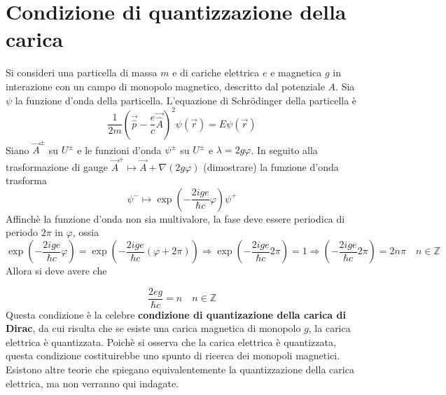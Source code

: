 \section{Condizione di quantizzazione della carica}
Si consideri una particella di massa $m$ e di cariche elettrica $e$ e magnetica
$g$ in interazione con un campo di monopolo magnetico, descritto dal potenziale
$A$. Sia $\psi$ la funzione d'onda della particella. L'equazione di Schrödinger
della particella è
\begin{equation}
   \frac{1}{2m}\left( \vec{\hat{p}} - \frac{e}{c} \vec{\hat{A}} \right)^2 \psi(\vec r) = E\psi(\vec r)
\end{equation}
Siano $\vec A^\pm$ su $U^\pm$ e le funzioni d'onda $\psi^\pm$ su $U^\pm$ e $\lambda =2g\varphi$.
In seguito alla trasformazione di gauge $ \vec A^+ \mapsto \vec A + \nabla (2g\varphi)$ (dimostrare)
la funzione d'onda trasforma
$$ \psi^- \mapsto \exp \left( - \frac{2ige}{\hbar c} \varphi \right) \psi^+$$
Affinchè la funzione d'onda non sia multivalore, la fase deve essere periodica di
periodo $2\pi$ in $\varphi$, ossia
$$
   \exp \left( - \frac{2ige}{\hbar c} \varphi \right)
      = \exp \left( - \frac{2ige}{\hbar c} (\varphi + 2\pi) \right)
   \Rightarrow
   \exp \left( - \frac{2ige}{\hbar c} 2\pi \right) = 1
   \Rightarrow
   \left( - \frac{2ige}{\hbar c} 2\pi \right) = 2n\pi \quad n \in \mathbb{Z}
$$
Allora si deve avere che

\begin{equation}\label{eq:diracquantumcharge}
   \boxed{
      \frac{2eg}{\hbar c} = n \quad  n \in \mathbb{Z}
   }
\end{equation}
Questa condizione è la celebre \textbf{condizione di quantizazione della carica
di Dirac}, da cui risulta che se esiste una carica magnetica di monopolo $g$,
la carica elettrica è quantizzata. Poichè si osserva che la carica elettrica è
quantizzata, questa condizione costituirebbe uno spunto di ricerca dei monopoli
magnetici.\\
Esistono altre teorie che spiegano equivalentemente la quantizzazione della carica
elettrica, ma non verranno qui indagate.\\
